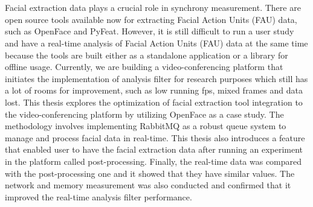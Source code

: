 \chapter{\abstractname}

Facial extraction data plays a crucial role in synchrony measurement. 
There are open source tools available now for extracting Facial Action Units (FAU) data,
 such as OpenFace and PyFeat.
However, it is still difficult to run a user study and have a real-time analysis of Facial Action Units (FAU) data
at the same time because the tools are built either as a standalone application 
or a library for offline usage.
Currently, we are building a video-conferencing platform that 
initiates the implementation of analysis filter
for research purposes which still has a lot of rooms for improvement, 
such as low running fps, mixed frames and data lost.
This thesis explores the optimization of facial extraction tool integration 
to the video-conferencing platform by utilizing OpenFace as a case study.
The methodology involves implementing RabbitMQ as a robust queue system to manage and process facial data in real-time.
This thesis also introduces a feature that 
enabled user to have the facial extraction data after running an experiment in the platform called post-processing.
Finally, the real-time data was compared with the post-processing one 
and it showed that they have similar values.
The network and memory measurement was also conducted and confirmed that it improved the real-time analysis filter performance.

